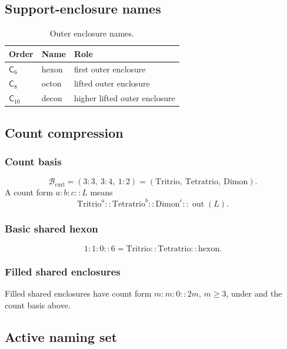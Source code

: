 \subsection{Support-enclosure names}
\label{app:cc-support-enclosure-names}

\begin{table}[H]
\centering
\caption{Outer enclosure names.}
\label{tab:cc-support-enclosure-names}
\renewcommand{\arraystretch}{1.15}
\begin{tabular}{@{}lll@{}}
\toprule
Order & Name & Role \\
\midrule
\(\mathsf C_6\) & hexon & first outer enclosure \\
\(\mathsf C_8\) & octon & lifted outer enclosure \\
\(\mathsf C_{10}\) & decon & higher lifted outer enclosure \\
\bottomrule
\end{tabular}
\end{table}

\subsection{Count compression}
\label{app:cc-count-compression}

\subsubsection{Count basis}
\label{app:cc-count-basis}
\[
\mathcal B_{\mathrm{curl}}
=(3:3,\ 3:4,\ 1:2)
=(\mathrm{Tritrio},\ \mathrm{Tetratrio},\ \mathrm{Dimon}).
\]
A count form \(a:b:c::L\) means
\[
\mathrm{Tritrio}^{a}::\mathrm{Tetratrio}^{b}::\mathrm{Dimon}^{c}::\operatorname{out}(L).
\]

\subsubsection{Basic shared hexon}
\label{app:cc-basic-shared-hexon}
\[
1:1:0::6
=
\mathrm{Tritrio}::\mathrm{Tetratrio}::\mathrm{hexon}.
\]
\subsubsection{Filled shared enclosures}
\label{app:cc-filled-shared-enclosures}

Filled shared enclosures have count form \(m:m:0::2m\), \(m\ge3\), under
 and the count basis above.


\subsection{Active naming set}
\label{app:cc-active-naming-set}
\label{app:cc-standalone-enclosed-names}

